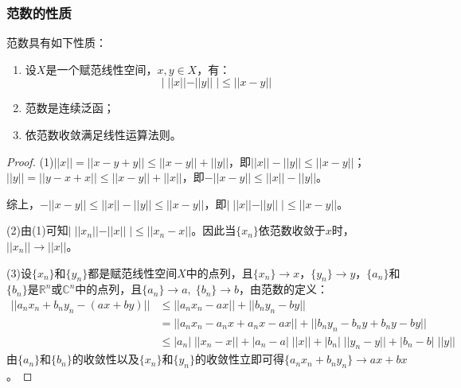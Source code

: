 \subsubsection{范数的性质}
\begin{property}
	范数具有如下性质：
	\begin{enumerate}
		\item 设$X$是一个赋范线性空间，$x,y\in X$，有：
		\begin{equation*}
			|\;||x||-||y||\;|\leqslant||x-y||
		\end{equation*}
		\item 范数是连续泛函；
		\item 依范数收敛满足线性运算法则。 
	\end{enumerate}
\end{property}
\begin{proof}
	(1)$||x||=||x-y+y||\leqslant||x-y||+||y||$，即$||x||-||y||\leqslant||x-y||$；$||y||=||y-x+x||\leqslant||x-y||+||x||$，即$-||x-y||\leqslant||x||-||y||$。\par
	综上，$-||x-y||\leqslant||x||-||y||\leqslant||x-y||$，即$|\;||x||-||y||\;|\leqslant||x-y||$。\par
	(2)由(1)可知$|\;||x_n||-||x||\;|\leqslant||x_n-x||$。因此当$\{x_n\}$依范数收敛于$x$时，$||x_n||\to||x||$。\par
	(3)设$\{x_n\}$和$\{y_n\}$都是赋范线性空间$X$中的点列，且$\{x_n\}\rightarrow x$，$\{y_n\}\rightarrow y$，$\{a_n\}$和$\{b_n\}$是$\mathbb{R}^{n}$或$\mathbb{C}^{n}$中的点列，且$\{a_n\}\to a,\;\{b_n\}\to b$，由范数的定义：
	\begin{align*}
		||a_nx_n+b_ny_n-(ax+by)||
		&\leqslant||a_nx_n-ax||+||b_ny_n-by|| \\
		&=||a_nx_n-a_nx+a_nx-ax||+||b_ny_n-b_ny+b_ny-by|| \\
		&\leqslant|a_n|\;||x_n-x||+|a_n-a|\;||x||+|b_n|\;||y_n-y||+|b_n-b|\;||y||
	\end{align*}
	由$\{a_n\}$和$\{b_n\}$的收敛性以及$\{x_n\}$和$\{y_n\}$的收敛性立即可得$\{a_nx_n+b_ny_n\}\to ax+bx$。
\end{proof}
